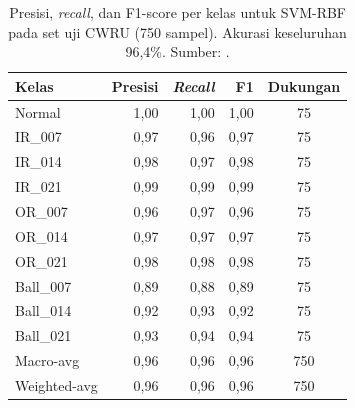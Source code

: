 \begin{table}[ht]
  \centering
  \caption{Presisi, \emph{recall}, dan F1-score per kelas untuk SVM-RBF
           pada set uji CWRU (750 sampel). Akurasi keseluruhan 96,4\%.
           Sumber: .}
  \label{tab:lampE_f1_svm}
  \footnotesize
  \begin{tabular}{@{}lrrrc@{}}
    \toprule
    \textbf{Kelas} & \textbf{Presisi} & \textbf{\emph{Recall}} & \textbf{F1} & \textbf{Dukungan} \\
    \midrule
    Normal        & 1,00 & 1,00 & 1,00 & 75 \\
    IR\_007       & 0,97 & 0,96 & 0,97 & 75 \\
    IR\_014       & 0,98 & 0,97 & 0,98 & 75 \\
    IR\_021       & 0,99 & 0,99 & 0,99 & 75 \\
    OR\_007       & 0,96 & 0,97 & 0,96 & 75 \\
    OR\_014       & 0,97 & 0,97 & 0,97 & 75 \\
    OR\_021       & 0,98 & 0,98 & 0,98 & 75 \\
    Ball\_007     & 0,89 & 0,88 & 0,89 & 75 \\
    Ball\_014     & 0,92 & 0,93 & 0,92 & 75 \\
    Ball\_021     & 0,93 & 0,94 & 0,94 & 75 \\
    \midrule
    Macro-avg     & 0,96 & 0,96 & 0,96 & 750 \\
    Weighted-avg  & 0,96 & 0,96 & 0,96 & 750 \\
    \bottomrule
  \end{tabular}
\end{table}

